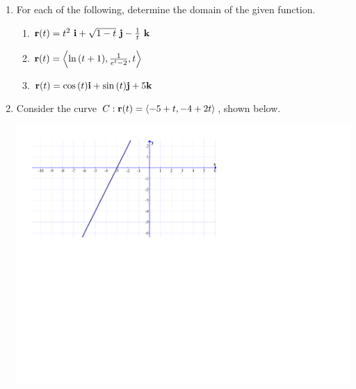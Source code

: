 \documentclass[12pt]{article}
\newif\ifans
\begin{document}
\begin{enumerate}

\item For each of the following, determine the domain of the given function.

\begin{enumerate}

\item ${\bf r}(t)=t^2\text{ }{\bf i}+\sqrt{1-t}\text{ }{\bf j}-\frac{1}{t}\text{ }{\bf k}$

\ifans{\fbox{$(-\infty,0)\cup(0,1]$}} \fi

\item ${\bf r}(t)=\left\langle \ln{(t+1)}, \frac{1}{e^t-2}, t\right\rangle$

\ifans{\fbox{$(-1,\ln2)\cup(\ln2,\infty)$}} \fi

\item ${\bf r}(t)=\cos{(t)}{\bf i}+\sin{(t)}{\bf j}+5{\bf k}$

\ifans{\fbox{$(-\infty,\infty)$}} \fi

\end{enumerate}

\newpage

\item Consider the curve $C: {\bf r}(t)=\langle -5+t,-4+2t\rangle$, shown below.

\begin{center}
\includegraphics[scale=0.58]{line.pdf}
\end{center}

\begin{enumerate}


\end{enumerate}
\end{enumerate}
\end{document}
